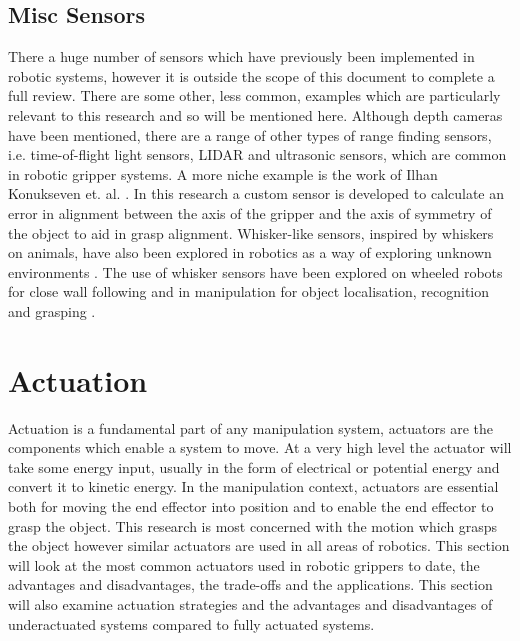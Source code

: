 \subsection{Misc Sensors}

There a huge number of sensors which have previously been implemented in robotic systems, however it is outside the scope of this document to complete a full review. There are some other, less common, examples which are particularly relevant to this research and so will be mentioned here. Although depth cameras have been mentioned, there are a range of other types of range finding sensors, i.e. time-of-flight light sensors, LIDAR and ultrasonic sensors, which are common in robotic gripper systems. A more niche example is the work of Ilhan Konukseven et. al. \cite{FingertipEmitterReceiverMovingObjectII, FingertipEmitterReceiverMovingObject}. In this research a custom sensor is developed to calculate an error in alignment between the axis of the gripper and the axis of symmetry of the object to aid in grasp alignment. Whisker-like sensors, inspired by whiskers on animals, have also been explored in robotics as a way of exploring unknown environments \cite{2000Konukseven}. The use of whisker sensors have been explored on wheeled robots for close wall following \cite{CloseWallFollowing} and in manipulation for object localisation, recognition and grasping \cite{TactilePerception}.


\section{Actuation}\label{Actuation}
Actuation is a fundamental part of any manipulation system, actuators are the components which enable a system to move. At a very high level the actuator will take some energy input, usually in the form of electrical or potential energy and convert it to kinetic energy. In the manipulation context, actuators are essential both for moving the end effector into position and to enable the end effector to grasp the object. This research is most concerned with the motion which grasps the object however similar actuators are used in all areas of robotics. This section will look at the most common actuators used in robotic grippers to date, the advantages and disadvantages, the trade-offs and the applications. This section will also examine actuation strategies and the advantages and disadvantages of underactuated systems compared to fully actuated systems.

